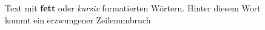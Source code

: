 \documentclass{article}
\begin{document}
Text mit \textbf{fett} oder \textit{kursiv} formatierten Wörtern.
Hinter diesem Wort \\ kommt ein erzwungener Zeilenumbruch
\end{document}
